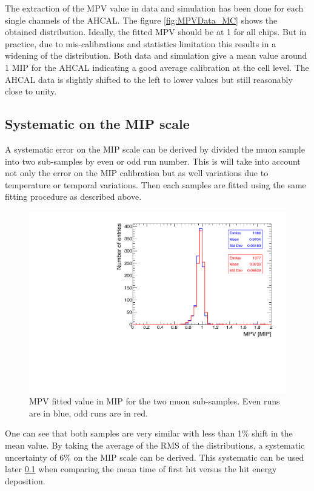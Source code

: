 The extraction of the MPV value in data and simulation has been done for each single channels of the AHCAL. The figure \ref{fig:MPVData_MC} shows the obtained distribution. Ideally, the fitted MPV should be at 1 for all chips. But in practice, due to mis-calibrations and statistics limitation this results in a widening of the distribution. Both data and simulation give a mean value around 1 MIP for the AHCAL indicating a good average calibration at the cell level. The AHCAL data is slightly shifted to the left to lower values but still reasonably close to unity.

\subsection{Systematic on the MIP scale}

A systematic error on the MIP scale can be derived by divided the muon sample into two sub-samples by even or odd run number. This is will take into account not only the error on the MIP calibration but as well variations due to temperature or temporal variations. Then each samples are fitted using the same fitting procedure as described above.

\begin{figure}[htbp!]
	\centering
	\includegraphics[width=0.7\linewidth]{chap5/fig_EnergyCalib/SystematicMIP.pdf}
	\caption{MPV fitted value in MIP for the two muon sub-samples. Even runs are in blue, odd runs are in red.} \label{fig:MIPSyst}
\end{figure}

One can see that both samples are very similar with less than 1\% shift in the mean value. By taking the average of the RMS of the distributions, a systematic uncertainty of 6\% on the MIP scale can be derived. This systematic can be used later \ref{} when comparing the mean time of first hit versus the hit energy deposition.

